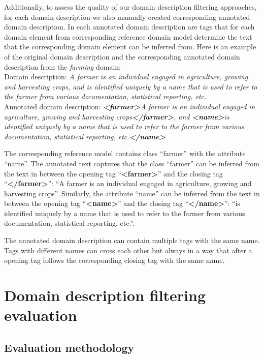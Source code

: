 Additionally, to assess the quality of our domain description filtering approaches, for each domain description we also manually created corresponding annotated domain description. In each annotated domain description are tags that for each domain element from corresponding reference domain model determine the text that the corresponding domain element can be inferred from. Here is an example of the original domain description and the corresponding annotated domain description from the \emph{farming} domain: \\

\noindent{}Domain description: \textit{A farmer is an individual engaged in agriculture, growing and harvesting crops, and is identified uniquely by a name that is used to refer to the farmer from various documentation, statistical reporting, etc.} \\

\noindent{}Annotated domain description: \textit{\textbf{<farmer>}A farmer is an individual engaged in agriculture, growing and harvesting crops\textbf{</farmer>}, and \textbf{<name>}is identified uniquely by a name that is used to refer to the farmer from various documentation, statistical reporting, etc.\textbf{</name>}}

The corresponding reference model contains class ``farmer'' with the attribute ``name''. The annotated text captures that the class ``farmer'' can be inferred from the text in between the opening tag ``\textbf{<farmer>}'' and the closing tag ``\textbf{</farmer>}'': ``A farmer is an individual engaged in agriculture, growing and harvesting crops''. Similarly, the attribute ``name'' can be inferred from the text in between the opening tag ``\textbf{<name>}'' and the closing tag ``\textbf{</name>}'': ``is identified uniquely by a name that is used to refer to the farmer from various documentation, statistical reporting, etc.''.

The annotated domain description can contain multiple tags with the same name. Tags with different names can cross each other but always in a way that after a opening tag follows the corresponding closing tag with the same name.


\section{Domain description filtering evaluation}
\label{sec:filtering_evaluation}

\subsection{Evaluation methodology}


